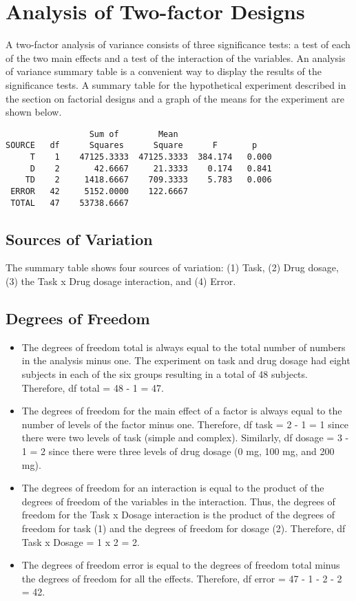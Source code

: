 \documentclass[a4paper,12pt]{article}
\begin{document}
\section{Analysis of Two-factor Designs}

A two-factor analysis of variance consists of three significance tests: a test of each of the two main effects and a test of the interaction of the variables. An analysis of variance summary table is a convenient way to display the results of the significance tests. A summary table for the hypothetical experiment described in the section on factorial designs and a graph of the means for the experiment are shown below.

\begin{verbatim}
                 Sum of        Mean
SOURCE   df      Squares      Square      F       p
     T    1    47125.3333  47125.3333  384.174   0.000
     D    2       42.6667     21.3333    0.174   0.841
    TD    2     1418.6667    709.3333    5.783   0.006
 ERROR   42     5152.0000    122.6667
 TOTAL   47    53738.6667
\end{verbatim}

\subsection{Sources of Variation}

The summary table shows four sources of variation: (1) Task, (2) Drug dosage, (3) the Task x Drug dosage interaction, and (4) Error.

\subsection{Degrees of Freedom}

\begin{itemize}
\item The degrees of freedom total is always equal to the total number of numbers in the analysis minus one. The experiment on task and drug dosage had eight subjects in each of the six groups resulting in a total of 48 subjects. Therefore, df total = 48 - 1 = 47.

\item The degrees of freedom for the main effect of a factor is always equal to the number of levels of the factor minus one. Therefore, df task = 2 - 1 = 1 since there were two levels of task (simple and complex). Similarly, df dosage = 3 - 1 = 2 since there were three levels of drug dosage (0 mg, 100 mg, and 200 mg).

\item The degrees of freedom for an interaction is equal to the product of the degrees of freedom of the variables in the interaction. Thus, the degrees of freedom for the Task x Dosage interaction is the product of the degrees of freedom for task (1) and the degrees of freedom for dosage (2). Therefore, df Task x Dosage = 1 x 2 = 2.

\item The degrees of freedom error is equal to the degrees of freedom total minus the degrees of freedom for all the effects. Therefore, df error = 47 - 1 - 2 - 2 = 42.
\end{itemize}
\end{document}
